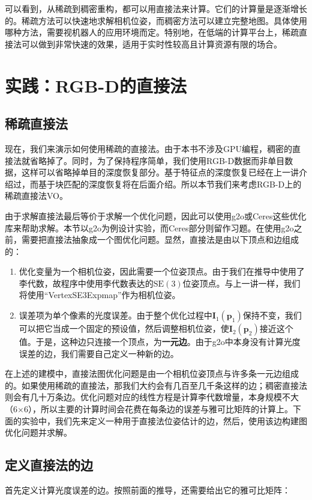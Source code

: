 可以看到，从稀疏到稠密重构，都可以用直接法来计算。它们的计算量是逐渐增长的。稀疏方法可以快速地求解相机位姿，而稠密方法可以建立完整地图。具体使用哪种方法，需要视机器人的应用环境而定。特别地，在低端的计算平台上，稀疏直接法可以做到非常快速的效果，适用于实时性较高且计算资源有限的场合\textsuperscript{\cite{Engel2016}}。

\section{实践：RGB-D的直接法}
\subsection{稀疏直接法}
现在，我们来演示如何使用稀疏的直接法。由于本书不涉及GPU编程，稠密的直接法就省略掉了。同时，为了保持程序简单，我们使用RGB-D数据而非单目数据，这样可以省略掉单目的深度恢复部分。基于特征点的深度恢复已经在上一讲介绍过，而基于块匹配的深度恢复将在后面介绍。所以本节我们来考虑RGB-D上的稀疏直接法VO。

由于求解直接法最后等价于求解一个优化问题，因此可以使用g2o或Ceres这些优化库来帮助求解。本节以g2o为例设计实验，而Ceres部分则留作习题。在使用g2o之前，需要把直接法抽象成一个图优化问题。显然，直接法是由以下顶点和边组成的：

\begin{enumerate}
	\item 优化变量为一个相机位姿，因此需要一个位姿顶点。由于我们在推导中使用了李代数，故程序中使用李代数表达的$\mathrm{SE}(3)$位姿顶点。与上一讲一样，我们将使用“VertexSE3Expmap”作为相机位姿。
	\item 误差项为单个像素的光度误差。由于整个优化过程中$\bm{I}_1(\bm{p}_1)$保持不变，我们可以把它当成一个固定的预设值，然后调整相机位姿，使$\bm{I}_2(\bm{p}_2)$接近这个值。于是，这种边只连接一个顶点，为\textbf{一元边}。由于g2o中本身没有计算光度误差的边，我们需要自己定义一种新的边。
\end{enumerate}

在上述的建模中，直接法图优化问题是由一个相机位姿顶点与许多条一元边组成的。如果使用稀疏的直接法，那我们大约会有几百至几千条这样的边；稠密直接法则会有几十万条边。优化问题对应的线性方程是计算李代数增量，本身规模不大（6$\times$6），所以主要的计算时间会花费在每条边的误差与雅可比矩阵的计算上。下面的实验中，我们先来定义一种用于直接法位姿估计的边，然后，使用该边构建图优化问题并求解。

\subsection{定义直接法的边}
首先定义计算光度误差的边。按照前面的推导，还需要给出它的雅可比矩阵：

